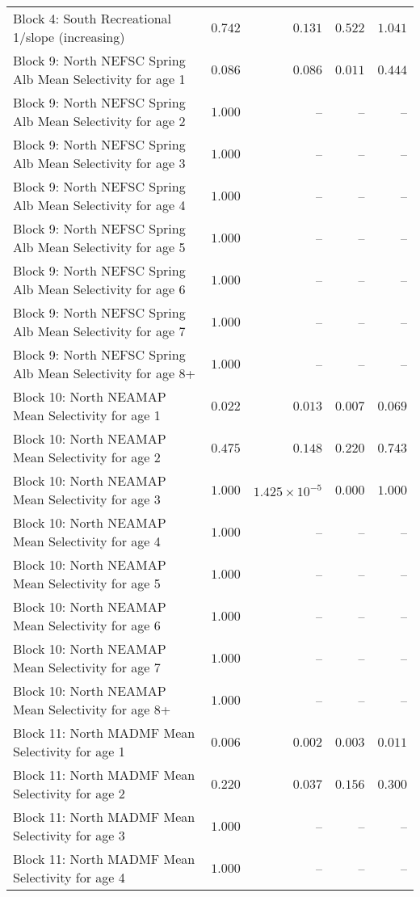 \documentclass[
]{article}
\begin{document}
\begin{landscape}
\begin{longtable}[t]{lrrrr}
Block 4: South Recreational 1/slope (increasing) & $0.742$ & $0.131$ & $0.522$ & $1.041$\\
Block 9: North NEFSC Spring Alb Mean Selectivity for age 1 & $0.086$ & $0.086$ & $0.011$ & $0.444$\\
Block 9: North NEFSC Spring Alb Mean Selectivity for age 2 & $1.000$ & -- & -- & --\\
Block 9: North NEFSC Spring Alb Mean Selectivity for age 3 & $1.000$ & -- & -- & --\\
\addlinespace
Block 9: North NEFSC Spring Alb Mean Selectivity for age 4 & $1.000$ & -- & -- & --\\
Block 9: North NEFSC Spring Alb Mean Selectivity for age 5 & $1.000$ & -- & -- & --\\
Block 9: North NEFSC Spring Alb Mean Selectivity for age 6 & $1.000$ & -- & -- & --\\
Block 9: North NEFSC Spring Alb Mean Selectivity for age 7 & $1.000$ & -- & -- & --\\
Block 9: North NEFSC Spring Alb Mean Selectivity for age 8+ & $1.000$ & -- & -- & --\\
\addlinespace
Block 10: North NEAMAP Mean Selectivity for age 1 & $0.022$ & $0.013$ & $0.007$ & $0.069$\\
Block 10: North NEAMAP Mean Selectivity for age 2 & $0.475$ & $0.148$ & $0.220$ & $0.743$\\
Block 10: North NEAMAP Mean Selectivity for age 3 & $1.000$ & $1.425\times 10^{-5}$ & $0.000$ & $1.000$\\
Block 10: North NEAMAP Mean Selectivity for age 4 & $1.000$ & -- & -- & --\\
Block 10: North NEAMAP Mean Selectivity for age 5 & $1.000$ & -- & -- & --\\
\addlinespace
Block 10: North NEAMAP Mean Selectivity for age 6 & $1.000$ & -- & -- & --\\
Block 10: North NEAMAP Mean Selectivity for age 7 & $1.000$ & -- & -- & --\\
Block 10: North NEAMAP Mean Selectivity for age 8+ & $1.000$ & -- & -- & --\\
Block 11: North MADMF Mean Selectivity for age 1 & $0.006$ & $0.002$ & $0.003$ & $0.011$\\
Block 11: North MADMF Mean Selectivity for age 2 & $0.220$ & $0.037$ & $0.156$ & $0.300$\\
\addlinespace
Block 11: North MADMF Mean Selectivity for age 3 & $1.000$ & -- & -- & --\\
Block 11: North MADMF Mean Selectivity for age 4 & $1.000$ & -- & -- & --\\

\end{longtable}
\end{landscape}
\end{document}
